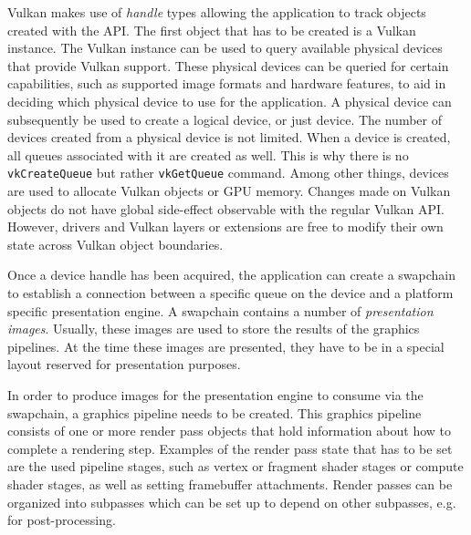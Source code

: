     Vulkan makes use of \textit{handle} types allowing the \gls{application} to track objects created with the API. The first object that has to be created is a Vulkan instance. The Vulkan instance can be used to query available physical \glspl{device} that provide Vulkan support. These physical \glspl{device} can be queried for certain capabilities, such as supported image formats and hardware features, to aid in deciding which physical device to use for the \gls{application}. A physical device can subsequently be used to create a logical device, or just device. The number of \glspl{device} created from a physical device is not limited. When a device is created, all queues associated with it are created as well. This is why there is no \lstinline{vkCreateQueue} but rather \lstinline{vkGetQueue} command. Among other things, \glspl{device} are used to allocate Vulkan objects or GPU memory. Changes made on Vulkan objects do not have global side-effect observable with the regular Vulkan API. However, \glspl{driver} and Vulkan layers or extensions are free to modify their own state across Vulkan object boundaries.

    \begin{figure}
      \centering
      \caption{}
      \label{fig:VulkanInitialization}
    \end{figure}


    Once a device handle has been acquired, the \gls{application} can create a swapchain to establish a connection between a specific queue on the device and a platform specific presentation engine. A swapchain contains a number of \textit{presentation images}. Usually, these images are used to store the results of the graphics pipelines. At the time these images are presented, they have to be in a special layout reserved for presentation purposes.

    In order to produce images for the presentation engine to consume via the swapchain, a graphics pipeline needs to be created. This graphics pipeline consists of one or more render pass objects that hold information about how to complete a rendering step. Examples of the render pass state that has to be set are the used pipeline stages, such as vertex or fragment shader stages or compute shader stages, as well as setting framebuffer attachments. Render passes can be organized into subpasses which can be set up to depend on other subpasses, e.g. for post-processing.

